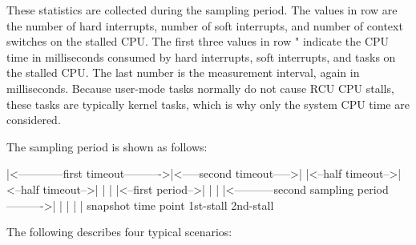 These statistics are collected during the sampling period.
The values
in row  are the number of hard interrupts, number of soft
interrupts, and number of context switches on the stalled CPU\@.
The
first three values in row " indicate the CPU time in
milliseconds consumed by hard interrupts, soft interrupts, and tasks
on the stalled CPU\@.
The last number is the measurement interval, again
in milliseconds.
Because user-mode tasks normally do not cause RCU CPU
stalls, these tasks are typically kernel tasks, which is why only the
system CPU time are considered.

The sampling period is shown as follows:

\begin{VerbatimU}
  |<------------first timeout---------->|<-----second timeout----->|
  |<--half timeout-->|<--half timeout-->|                          |
  |                  |<--first period-->|                          |
  |                  |<-----------second sampling period---------->|
  |                  |                  |                          |
             snapshot time point    1st-stall                  2nd-stall
\end{VerbatimU}

The following describes four typical scenarios:

